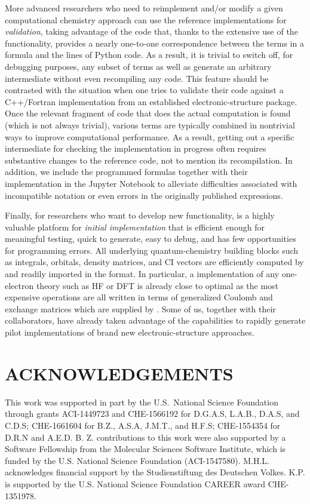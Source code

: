\documentclass[%
  class = book,%
  crop = false,%
  float = true,%
  multi = true,%
  preview = false,%
]{standalone}
\newcommand{\caps}[1]{\uppercase{#1}}
\begin{document}
More advanced researchers who need to reimplement and/or modify a given computational chemistry approach can use the \pfn reference implementations for \emph{validation}, taking advantage of the code that, thanks to the extensive use of the \numpy \einsum functionality, provides a nearly one-to-one correspondence between the terms in a formula and the lines of Python code. As a result, it is trivial to switch off, for debugging purposes, any subset of terms as well as generate an arbitrary intermediate without even recompiling any code.  This feature should be contrasted with the situation when one tries to validate their code against a C++/Fortran implementation from an established electronic-structure package. Once the relevant fragment of code that does the actual computation is found (which is not always trivial), various terms are typically combined in nontrivial ways to improve computational performance. As a result, getting out a specific intermediate for checking the implementation in progress often requires substantive changes to the reference code, not to mention its recompilation.  In addition, we include the programmed formulas together with their implementation in the Jupyter Notebook to alleviate difficulties associated with incompatible notation or even errors in the originally published expressions.

Finally, for researchers who want to develop new functionality, \pfn is a highly valuable platform for \emph{initial implementation} that is efficient enough for meaningful testing, quick to generate, easy to debug, and has few opportunities for programming errors. All underlying quantum-chemistry building blocks such as integrals, orbitals, density matrices, and CI vectors are efficiently computed by \pfour and readily imported in the \numpy format. In particular, a \pfn implementation of any one-electron theory such as HF or DFT is already close to optimal as the most expensive operations are all written in terms of generalized Coulomb and exchange matrices which are supplied by \pfour.  Some of us, together with their collaborators, have already taken advantage of the \pfn capabilities to rapidly generate pilot implementations of brand new electronic-structure approaches.

\section{\texorpdfstring{\caps{Acknowledgements}}{Acknowledgements}}

This work was supported in part by the U.S.~National Science Foundation through grants ACI-1449723 and CHE-1566192 for D.G.A.S, L.A.B., D.A.S, and C.D.S; CHE-1661604 for B.Z., A.S.A, J.M.T., and H.F.S; CHE-1554354 for D.R.N and A.E.D. B. Z. contributions to this work were also supported by a Software Fellowship from the Molecular Sciences Software Institute, which is funded by the U.S. National Science Foundation (ACI-1547580). M.H.L. acknowledges financial support by the Studienstiftung des Deutschen Volkes. K.P. is supported by the U.S. National Science Foundation CAREER award CHE-1351978.
\end{document}
